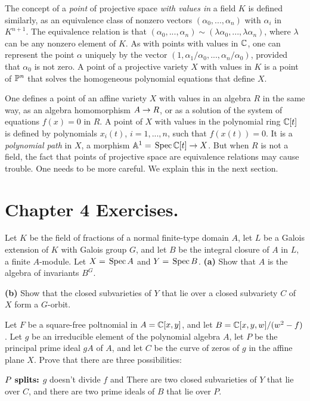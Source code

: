 \documentclass[leqno]{book}
\newcommand\Marginnote[1]{\marginnote{\hspace{-12pt}\normalfont{#1}}}
\theoremstyle{definition}%
\numberwithin{equation}{section}
\theoremstyle{theorem} %
\begin{document}
\ms The concept of a {\it point} of projective space {\it with values
  in} a field $K$ is defined similarly, as an equivalence class of
nonzero vectors $(\alpha_0,...,\alpha_n)$ with $\alpha_i$ in
$K^{n+1}$.  The equivalence relation is that $(\alpha_0,...,\alpha_n)
\sim (\lambda\alpha_0,...,\lambda\alpha_n)$, where $\lambda$ can be
any nonzero element of $K$.  As with points with values in $\mathbb{C}$, one
can represent the point $\alpha$ uniquely by the vector
$(1,\alpha_1/\alpha_0,...,\alpha_n/\alpha_0)$, provided that
$\alpha_0$ is not zero.  A point of a projective variety
$X$ with values in $K$ is a point of $\mathbb{P}^n$ that solves the
homogeneous polynomial equations that define $X$.

\ms One defines a point of an affine variety $X$ with values in an
algebra $R$ in the same way, as an algebra homomorphism $A \rightarrow R$, or
as a solution of the system of equations $f(x)=0$ in $R$.  A point of
$X$ with values in the polynomial ring $\mathbb{C}[t]$ is defined by
polynomials $x_i(t)$, $i=1,...,n$, such that $f(x(t))=0$.  It is a
{\it polynomial path} in $X$, a morphism $\mathbb{A}^1 = \,\operatorname{Spec} \mathbb{C}[t] \rightarrow
X$.  But when $R$ is not a field, the fact that points of projective
space are equivalence relations may cause trouble.  One needs to be
more careful.  We explain this in the next section.

\newpage

\section{Chapter 4 Exercises.}\Marginnote{exchapfour}\label{exchap4}


\bs
  Let $K$ be the field of fractions of a normal finite-type domain
  $A$, let $L$ be a Galois extension of $K$ with Galois group $G$, and
  let $B$ be the integral closure of $A$ in $L$, a finite $A$-module.
Let $X=\,\operatorname{Spec} A$ and $Y
=\,\operatorname{Spec} B$. 
\no
{\bf (a)}  Show that $A$ is the algebra of invariants $B^G$. 

\no
{\bf (b)}  Show that the closed subvarieties of $Y$ that lie over a closed
subvariety $C$ of $X$ form a $G$-orbit.

\bs Let $F$ be a square-free poltnomial in $A = \mathbb{C}[x,y]$, and let $B
= \mathbb{C}[x,y,w]/(w^2-f)$.  Let $g$ be an irreducible element of the
polynomial algebra $A$, let $P$ be the principal prime ideal $gA$ of
$A$, and let $C$ be the curve of zeros of $g$ in the affine plane $X$.
Prove that there are three possibilities:

\no $\text{\bf{$P$ splits:}}$ $g$ doesn't divide $f$ and There are two
closed subvarieties of $Y$ that lie over $C$, and there are two prime
ideals of $B$ that lie over $P$.
\end{document}
